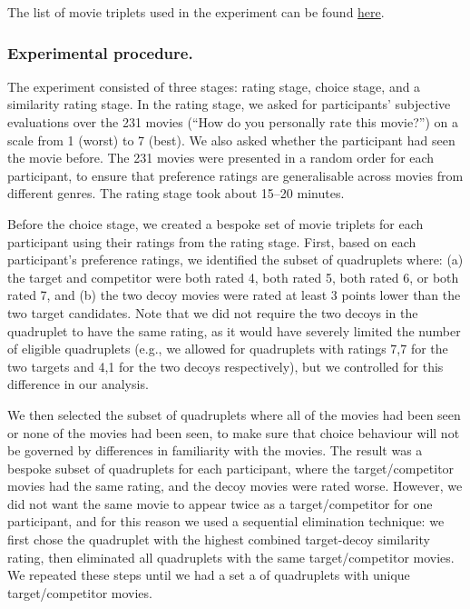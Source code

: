 \documentclass[12pt, a4paper]{article}
\begin{document}
The list of movie triplets used in the experiment can be found \href{https://osf.io/fme6c/?view_only=31da4193689f4247a76af93b2f98fcef}{here}.

\subsubsection*{Experimental procedure.}

The experiment consisted of three stages: rating stage, choice stage, and a similarity rating stage. In the rating stage, we asked for participants' subjective evaluations over the 231 movies (``How do you personally rate this movie?'') on a scale from 1 (worst) to 7 (best). We also asked whether the participant had seen the movie before. The 231 movies were presented in a random order for each participant, to ensure that preference ratings are generalisable across movies from different genres. The rating stage took about 15--20 minutes.

Before the choice stage, we created a bespoke set of movie triplets for each participant using their ratings from the rating stage. First, based on each participant's preference ratings, we identified the subset of quadruplets where: (a) the target and competitor were both rated 4, both rated 5, both rated 6, or both rated 7, and (b) the two decoy movies were rated at least 3 points lower than the two target candidates. Note that we did not require the two decoys in the quadruplet to have the same rating, as it would have severely limited the number of eligible quadruplets (e.g., we allowed for quadruplets with ratings 7,7 for the two targets and 4,1 for the two decoys respectively), but we controlled for this difference in our analysis.

We then selected the subset of quadruplets where all of the movies had been seen or none of the movies had been seen, to make sure that choice behaviour will not be governed by differences in familiarity with the movies. The result was a bespoke subset of quadruplets for each participant, where the target/competitor movies had the same rating, and the decoy movies were rated worse. However, we did not want the same movie to appear twice as a target/competitor for one participant, and for this reason we used a sequential elimination technique: we first chose the quadruplet with the highest combined target-decoy similarity rating, then eliminated all quadruplets with the same target/competitor movies. We repeated these steps until we had a set a of quadruplets with unique target/competitor movies.
\end{document}

